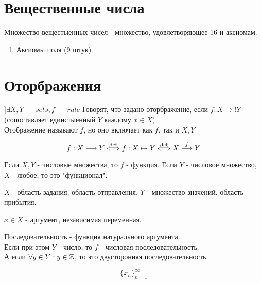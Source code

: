 \documentclass[12pt, a4paper]{article}
\begin{document}
    \section{Вещественные числа}
    Множество вещестыенных чисел - множество, 
    удовлетворяющее 16-и аксиомам.

    \begin{enumerate}[]
      \item Аксиомы поля (9 штук)
    \end{enumerate}





    \section{Оторбражения}

    \begin{definition}[Отображение]
      $] \exists X, Y~-~sets, f~-~rule$
      Говорят, что задано оторбражение, если $f: X \longrightarrow! Y$ \\
      (сопоставляет единстыенный $Y$ каждому $x \in X$)\\
      
      Отображение называют $f$, но оно включает как $f$, так и $X, Y$  
    \end{definition}
    

    \begin{equation}
      f: X \longrightarrow Y \overset{\mathrm{def}}{\Longleftrightarrow} f: X \mapsto Y \overset{\mathrm{def}}{\Longleftrightarrow} X \overset{f}{\longrightarrow} Y
    \end{equation}


    Если $X, Y$ - числовые множества, то $f$ - функция.
    Если $Y$ - числовое множество, $X$ - любое, то это "функционал".

    $X$ - область задания, область отправления.
    $Y$ - множество значений, область прибытия.

    $x \in X$ - аргумент, независимая переменная.

    \begin{definition}[Последователности]
      Последовательность - функция натурального аргумента.\\
      Если при этом $Y$ - число, то $f$ - числовая последовательность.\\
      А если $\forall y \in Y: y \in {\mathbb{Z}}$, то это двусторонняя последовательность.
    \end{definition}

    \begin{equation}
      \{x_n\}_{n = 1}^{\infty}
    \end{equation}
\end{document}
